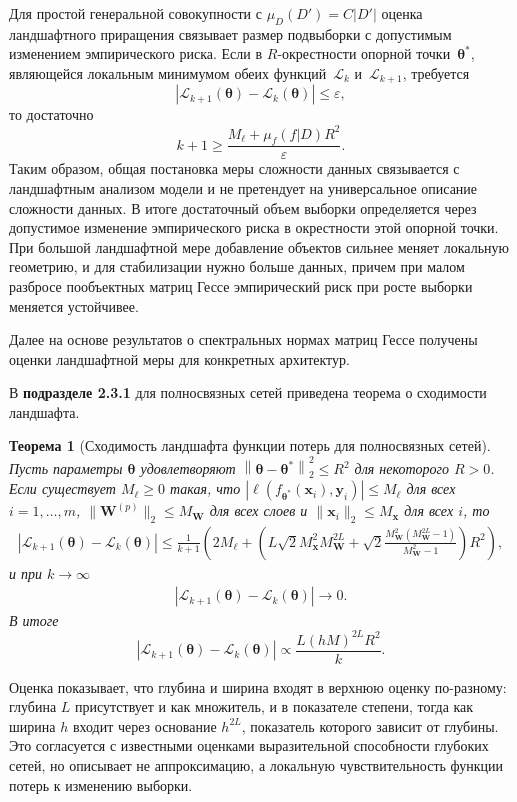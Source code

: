 \documentclass{dissert}
\newtheorem{theorem}{Теорема}
\begin{document}
Для простой генеральной совокупности с $\mu_D(D')=C|D'|$ оценка ландшафтного приращения связывает размер подвыборки с допустимым изменением эмпирического риска.
Если в $R$-окрестности опорной точки~$\boldsymbol{\theta}^*$, являющейся локальным минимумом обеих функций~$\mathcal{L}_k$ и~$\mathcal{L}_{k+1}$, требуется
\[
    |\mathcal{L}_{k+1}(\boldsymbol\theta)-\mathcal{L}_k(\boldsymbol\theta)|\le\varepsilon,
\]
то достаточно
\[
    k+1\ge\frac{M_\ell+\mu_f(f|D)R^2}{\varepsilon}.
\]
Таким образом, общая постановка меры сложности данных связывается с ландшафтным анализом модели и не претендует на универсальное описание сложности данных.
В итоге достаточный объем выборки определяется через допустимое изменение эмпирического риска в окрестности этой опорной точки.
При большой ландшафтной мере добавление объектов сильнее меняет локальную геометрию, и для стабилизации нужно больше данных, причем при малом разбросе пообъектных матриц Гессе эмпирический риск при росте выборки меняется устойчивее.

Далее на основе результатов о спектральных нормах матриц Гессе получены оценки ландшафтной меры для конкретных архитектур.

В \textbf{подразделе 2.3.1} для полносвязных сетей приведена теорема о сходимости ландшафта.

\begin{theorem}[Сходимость ландшафта функции потерь для полносвязных сетей]
Пусть параметры $\boldsymbol{\theta}$ удовлетворяют $\left\|\boldsymbol{\theta} - \boldsymbol{\theta}^*\right\|_2^2 \leqslant R^2$ для некоторого $R > 0$. Если существует $M_{\ell}\ge 0$ такая, что $\left| \ell(f_{\boldsymbol{\theta}^*}(\mathbf{x}_{i}), \mathbf{y}_{i}) \right| \leqslant M_{\ell}$ для всех $i = 1, \ldots, m$, $\|\mathbf{W}^{(p)}\|_2\le M_{\mathbf{W}}$ для всех слоев и $\|\mathbf{x}_i\|_2\le M_{\mathbf{x}}$ для всех $i$, то
    \begin{align}
        \left| \mathcal{L}_{k+1}(\boldsymbol{\theta}) - \mathcal{L}_k(\boldsymbol{\theta}) \right| \leqslant \frac{1}{k+1}\left( 2M_{\ell} + \left( L \sqrt{2} M_{\mathbf{x}}^2 M_{\mathbf{W}}^{2L} + \sqrt{2} \frac{M_{\mathbf{W}}^2 (M_{\mathbf{W}}^{2L} - 1)}{M_{\mathbf{W}}^2 - 1} \right) R^2 \right),
    \end{align}
    и при $k\to\infty$
    \begin{align}
        \left| \mathcal{L}_{k+1}(\boldsymbol{\theta}) - \mathcal{L}_k(\boldsymbol{\theta}) \right| \to 0.
    \end{align}
    В итоге
    \begin{equation}
        \left| \mathcal{L}_{k+1}(\boldsymbol{\theta}) - \mathcal{L}_k(\boldsymbol{\theta}) \right| \propto \frac{L (hM)^{2L} R^2}{k}.
    \end{equation}
\end{theorem}
Оценка показывает, что глубина и ширина входят в верхнюю оценку по-разному: глубина $L$ присутствует и как множитель, и в показателе степени, тогда как ширина $h$ входит через основание $h^{2L}$, показатель которого зависит от глубины.
Это согласуется с известными оценками выразительной способности глубоких сетей, но описывает не аппроксимацию, а локальную чувствительность функции потерь к изменению выборки.
\end{document}
